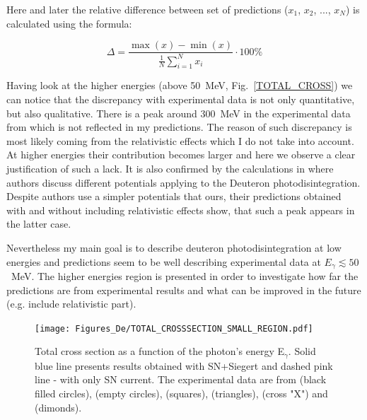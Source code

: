     Here and later the relative difference between set of predictions ($x_1$, $x_2$, ..., $x_N$) is calculated
    using the formula:

    \begin{equation}
        \Delta = \frac{\max(x) - \min(x)}{\frac{1}{N}\sum_{i=1}^N x_i} \cdot 100\%
    \end{equation}


    Having look at the higher energies (above 50~MeV, Fig.~\ref{TOTAL_CROSS})
    we can notice that the discrepancy with experimental data is not only 
    quantitative, but also qualitative.  There is a peak around 300~MeV
    in the experimental data from \cite{Bernabei1986} which is not
    reflected in my predictions. The reason of such discrepancy 
    is most likely coming from the relativistic effects
    which I do not take into account. At higher energies their contribution
    becomes larger and here we observe a clear justification of such a lack.
    It is also confirmed by the calculations in \cite{ArenhovelPhotodisint1991}
    where authors discuss different potentials applying to the Deuteron photodisintegration.
    Despite authors use a simpler potentials that ours, their predictions obtained with and without including
    relativistic effects show, that such a peak appears in the latter case. 
    
    Nevertheless my main goal is to describe deuteron photodisintegration at low energies and predictions seem to be well describing experimental data at
    $E_\gamma \lesssim 50$~MeV. The higher energies region is presented in order
    to investigate how far the predictions are from experimental results and 
    what can be improved in the future (e.g. include relativistic part). 
    
    \begin{figure}[h]
        \begin{center}
        \texttt{[image: Figures\_De/TOTAL\_CROSSSECTION\_SMALL\_REGION.pdf]}
        \end{center}
        \caption{Total cross section as a function of the photon's energy E$_\gamma$.
        Solid blue line presents results obtained with SN+Siegert 
        and dashed pink line - with only SN current.
        The experimental data are from \cite{Bernabei1986} (black filled circles),
        \cite{BOSMAN1979} (empty circles),
        \cite{ARENDS1984} (squares),
        \cite{Skopik1974} (triangles),
        \cite{Moreh1989} (cross "X") and
        \cite{Birenbaum1985} (dimonds).
        }
        \label{TOTAL_CROSS_small}
    \end{figure}

